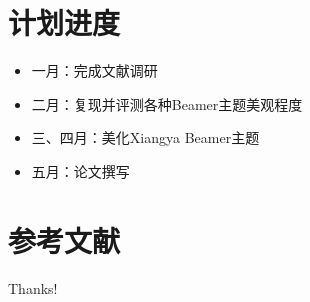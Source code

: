 \documentclass{beamer}
\begin{document}
\section{计划进度}
\begin{frame}
    \begin{itemize}
        \item 一月：完成文献调研
        \item 二月：复现并评测各种Beamer主题美观程度
        \item 三、四月：美化Xiangya Beamer主题
        \item 五月：论文撰写
    \end{itemize}
    \nocite{*}
\end{frame}


\section{参考文献}

\begin{frame}[allowframebreaks]
    \tiny
    
\end{frame}

\begin{frame}
    \begin{center}
        {\Huge Thanks!}
    \end{center}
\end{frame}
\end{document}

